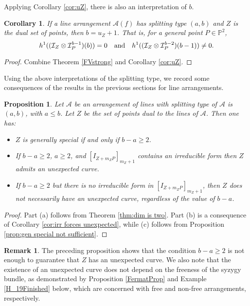 \documentclass[12pt]{amsart}
\numberwithin{equation}{section}
\newtheorem{proposition}[theorem]{Proposition}
\newtheorem{corollary}[theorem]{Corollary}
\theoremstyle{definition}
\newtheorem{remark}[theorem]{Remark}
\begin{document}
Applying Corollary \ref{cor:uZ}, there is also an interpretation of $b$. 

\begin{corollary}
   \label{cor:precise interprete b}
If a line arrangement $\mathcal A(f)$ has splitting type $(a, b)$ and $Z$ is the dual set of points, then $b = u_Z + 1$.    That is, for a general 
point $P \in \mathbb P^2$, 
\[
h^1((\mathcal I_Z \otimes \mathcal I_P^{b-1})(b)) = 0 \ \ \hbox{ and } \ \ 
h^1((\mathcal I_Z \otimes \mathcal I_P^{b-2})(b-1)) \neq 0.
\]
\end{corollary}

\begin{proof}
Combine Theorem \ref{FVstrong} and Corollary \ref{cor:uZ}. 
\end{proof} 

Using the above interpretations of the splitting type, we record some consequences of the results in the previous sections for line arrangements. 

\begin{proposition} \label{gen spec splitting type}
Let $\mathcal A$ be an arrangement of  lines with splitting type of $\mathcal A$ is $(a,b)$, with $a  \leq b$. Let $Z$ be the set of points dual to the lines of $\mathcal A$. Then one has: 
\begin{itemize}

\item[(a)] $Z$ is generally special if and only if $b-a \geq 2$. 

\item[(b)]   If $b-a \geq 2$, $a \ge 2$,  and $[I_{Z+m_ZP}]_{m_Z+1}$ contains an irreducible form then $Z$ admits an unexpected curve. 

\item[(d)] If $b-a \geq 2$ but there is no irreducible form in $[I_{Z+m_ZP}]_{m_Z+1}$, then $Z$ does not necessarily have an unexpected curve, regardless of the value of $b-a$.

\end{itemize}
\end{proposition}

\begin{proof}
Part (a) follows from Theorem \ref{thm:dim is two}. Part (b) is a consequence of Corollary \ref{cor:irr forces unexpected},  while (c) follows from Proposition \ref{prop:gen special not sufficient}.
\end{proof}

\begin{remark}
The preceding proposition shows that the condition $b-a \geq 2$  is not enough to guarantee that $Z$ has an unexpected curve. We also note that 
the existence of an unexpected curve does not depend on the freeness of the syzygy bundle, as demonstrated by Proposition \ref{FermatProp} 
and Example \ref{H_19Finished} below, which are concerned with free and non-free arrangements, respectively.
\end{remark} 
\end{document}
